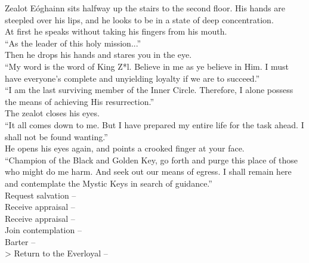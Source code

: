 Zealot Eóghainn sits halfway up the stairs to the second floor. His hands are steepled over his lips, and he looks to be in a state of deep concentration.\\

At first he speaks without taking his fingers from his mouth.\\
“As the leader of this holy mission...”\\

Then he drops his hands and stares you in the eye.\\
“My word is the word of King Z*l. Believe in me as ye believe in Him. I must have everyone’s complete and unyielding loyalty if we are to succeed.”\\

“I am the last surviving member of the Inner Circle. Therefore, I alone possess the means of achieving His resurrection.”\\

The zealot closes his eyes.\\
“It all comes down to me. But I have prepared my entire life for the task ahead. I shall not be found wanting.”\\

He opens his eyes again, and points a crooked finger at your face.\\
“Champion of the Black and Golden Key, go forth and purge this place of those who might do me harm. And seek out our means of egress. I shall remain here and contemplate the Mystic Keys in search of guidance.”\\

 Request salvation -- \\
 Receive appraisal -- \\
 Receive appraisal -- \\
 Join contemplation -- \\
 Barter -- \\
> Return to the Everloyal -- 